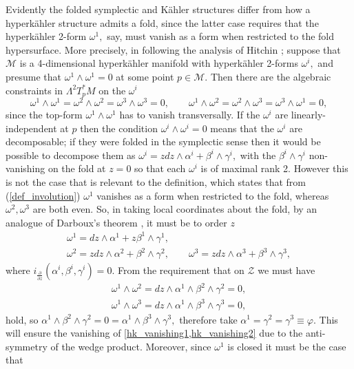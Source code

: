\documentclass[a4paper,12pt, onecolumn, notitlepage]{article}
\theoremstyle{definition}
\theoremstyle{remark}
\newcommand{\al}{\alpha}
\newcommand{\w}{\omega}
\newcommand{\dd}[2]{\frac{\partial #1}{\partial #2}}
\newcommand{\K}{K\"ahler }
\newcommand{\HK}{hyperk\"ahler }
\begin{document}
Evidently the folded symplectic and \K structures differ from how a \HK structure admits a fold, since the latter case requires that the \HK 2-form $\w^{1},$ say, must vanish as a form when restricted to the fold hypersurface. More precisely, in following the analysis of Hitchin \cite{hitchin_2015}; suppose that $\mathcal{M}$ is a 4-dimensional \HK manifold with \HK 2-forms $\w^{i},$ and presume that $\w^{1}\wedge\w^{1}=0$ at some point $p\in \mathcal{M}.$ Then there are the algebraic constraints in $\Lambda^{2}T_{p}^{\ast}M$ on the $\w^{i}$
\begin{equation*}
	\w^{1}\wedge\w^{1}=\w^{2}\wedge\w^{2}=\w^{3}\wedge\w^{3}=0, \qquad \w^{1}\wedge\w^{2}=\w^{2}\wedge\w^{3}=\w^{3}\wedge\w^{1}=0,
\end{equation*}
since the top-form $\w^{1}\wedge\w^{1}$ has to vanish transversally. If the $\w^{i}$ are linearly-independent at $p$ then the condition $\w^{i}\wedge\w^{i}=0$ means that the $\w^{i}$ are decomposable; if they were folded in the symplectic sense then it would be possible to decompose them as $\w^{i} = zdz\wedge\al^{i} + \beta^{i}\wedge\gamma^{i},$ with the $\beta^{i}\wedge\gamma^{i}$ non-vanishing on the fold at $z=0$ so that each $\w^{i}$ is of maximal rank 2. However this is not the case that is relevant to the definition, which states that from (\ref{def_involution}) $\w^{1}$ vanishes as a form when restricted to the fold, whereas $\w^{2},\w^{3}$ are both even. So, in taking local coordinates about the fold, by an analogue of Darboux's theorem \cite{dasilva_2000}, it must be to order $z$
\begin{gather*}
	\w^{1} = dz\wedge\al^{1} + z\beta^{1}\wedge\gamma^{1},\\\nonumber
	\w^{2} = zdz\wedge\al^{2} + \beta^{2}\wedge\gamma^{2},\qquad\w^{3} = zdz\wedge\al^{3} + \beta^{3}\wedge\gamma^{3},
\end{gather*}
where $i_{\dd{}{z}}(\al^{i},\beta^{i},\gamma^{i})=0.$ From the requirement that on $\mathcal{Z}$ we must have
\begin{subequations}
	\begin{gather}
	\w^{1}\wedge\w^{2}=dz\wedge\al^{1}\wedge\beta^{2}\wedge\gamma^{2} = 0,\label{hk_vanishing1}\\
	\w^{1}\wedge\w^{3}=dz\wedge\al^{1}\wedge\beta^{3}\wedge\gamma^{3} = 0,\label{hk_vanishing2}
	\end{gather}
\end{subequations}
hold, so $\al^{1}\wedge\beta^{2}\wedge\gamma^{2} = 0 = \al^{1}\wedge\beta^{3}\wedge\gamma^{3},$ therefore take $\al^{1}=\gamma^{2}=\gamma^{3}\equiv\varphi.$ This will ensure the vanishing of \cref{hk_vanishing1,hk_vanishing2} due to the anti-symmetry of the wedge product. Moreover, since $\w^{1}$ is closed it must be the case that
\end{document}
